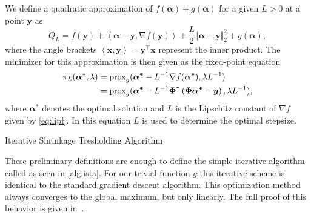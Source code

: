 We define a quadratic approximation of \(f (\bm{\alpha}) + g (\bm{\alpha})\) for a given \(L > 0\)
at a point \(\bm{y}\) as
\begin{equation}\label{eq:goal-approx}
  Q_{L} = f(\bm{y}) + \left< \bm{\alpha} - \bm{y}, \nabla f(\bm{y}) \right> + \frac{L}{2} \Vert \bm{\alpha} - \bm{y} \Vert_2^2 + g(\bm{\alpha}),
\end{equation}
where the angle brackets \( \left< \bm{x}, \bm{y} \right> = \bm{y}^\intercal \bm{x} \) represent the inner product.
The minimizer for this approximation is then given as the fixed-point equation
\begin{align}\label{eq:step}
\pi_L(\bm{\alpha}^*, \lambda) &= \prox[\(g\)]{\bm{\alpha^*} - L^{-1} \nabla f (\bm{\alpha^*})}{\lambda L^{-1} } \nonumber\\
       &= \prox[\(g\)]{\bm{\alpha^*} - L^{-1} \bm{\Phi}^\intercal \left(\bm{\Phi} \bm{\alpha^*} - \bm{y} \right)}
         {\lambda L^{-1}},
\end{align}
where \(\bm{\alpha}^*\) denotes the optimal solution and \(L\) is the Lipschitz
constant of \(\nabla f\) given by \autoref{eq:lipf}.
In this equation \(L\) is used to determine the optimal stepsize.

\begin{algorithm}
 \caption{Iterative Shrinkage Tresholding Algorithm}\label{alg:ista} 
 \begin{algorithmic}[1]
    \Statex
     
      \EndWhile
     \State \Return{\(\bm{\alpha}\)}
    \EndFunction
\end{algorithmic}
\end{algorithm}

These preliminary definitions are enough to define the simple iterative
algorithm called \ista as seen in \autoref{alg:ista}.
For our trivial function \(g\) this iterative scheme is identical to the standard gradient descent algorithm.
This optimization method always converges to the global maximum, but only
linearly. The full proof of this behavior is given in~\cite{fista}.

